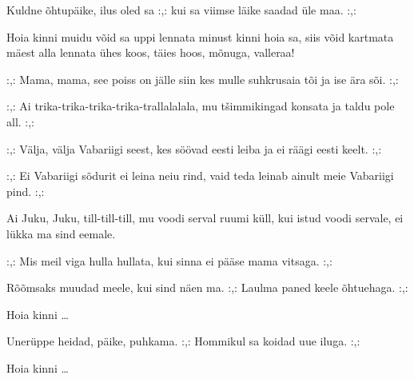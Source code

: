 
Kuldne \~ohtup\"aike, ilus oled sa
:,: kui sa viimse l\"aike saadad \"ule maa. :,:

Hoia kinni muidu v\~oid sa uppi lennata
minust kinni hoia sa,
siis v\~oid kartmata m\"aest alla lennata
\"uhes koos, t\"aies hoos, m\~onuga, valleraa!

:,: Mama, mama, see poiss on j\"alle siin
kes mulle suhkrusaia t\~oi ja ise \"ara s\~oi. :,:

:,: Ai trika-trika-trika-trika-trallalalala,
mu t\v{s}immikingad konsata ja taldu pole all. :,:

:,: V\"alja, v\"alja Vabariigi seest, kes
s\"o\"ovad eesti leiba ja ei r\"a\"agi eesti keelt. :,:

:,: Ei Vabariigi s\~odurit ei leina neiu rind,
vaid teda leinab ainult meie Vabariigi pind. :,:

Ai Juku, Juku, till-till-till,
mu voodi serval ruumi k\"ull,
kui istud voodi servale,
ei l\"ukka ma sind eemale.

:,: Mis meil viga hulla hullata,
kui sinna ei p\"a\"ase mama vitsaga. :,:

R\~o\~omsaks muudad meele, kui sind n\"aen ma.
:,: Laulma paned keele \~ohtuehaga. :,:

Hoia kinni \ldots

Uner\"uppe heidad, p\"aike, puhkama.
:,: Hommikul sa koidad uue iluga. :,:

Hoia kinni \ldots
